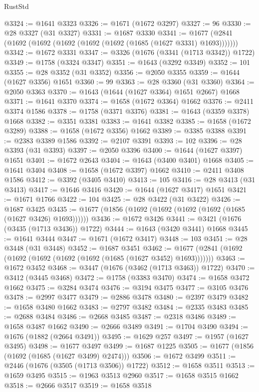 \begin{lexlean}{RustStd}
\begin{coremodule}
@3324 := @1641 @3323
@3326 := @1671 (@1672 @3297)
@3327 := 96
@3330 := @28 @3327 (@31 @3327)
@3331 := @1687 @3330
@3341 := @1677 (@2841 (@1692 (@1692 (@1692 (@1692 (@1692 (@1685 (@1627 @3331) @1693)))))))
@3342 := @1672 @3331
@3347 := @3326 (@1676 (@3341 (@1713 @3342)) @1722)
@3349 := @1758 (@3324 @3347)
@3351 := @1643 (@3292 @3349)
@3352 := 101
@3355 := @28 @3352 (@31 @3352)
@3356 := @2050 @3355
@3359 := @1644 (@1627 @3356) @1651
@3360 := 99
@3363 := @28 @3360 (@31 @3360)
@3364 := @2050 @3363
@3370 := @1643 (@1644 (@1627 @3364) @1651 @2667) @1668
@3371 := @1641 @3370
@3374 := @1658 (@1672 @3364) @1662
@3376 := @2411 @3374 @1586
@3378 := @1758 (@3371 @3376)
@3381 := @1643 (@3359 @3378) @1668
@3382 := @3351 @3381
@3383 := @1641 @3382
@3385 := @1658 (@1672 @3289)
@3388 := @1658 (@1672 @3356) @1662
@3389 := @3385 @3388
@3391 := @2383 @3389 @1586
@3392 := @2107 @3391
@3393 := 102
@3396 := @28 @3393 (@31 @3393)
@3397 := @2050 @3396
@3400 := @1644 (@1627 @3397) @1651
@3401 := @1672 @2643
@3404 := @1643 (@3400 @3401) @1668
@3405 := @1641 @3404
@3408 := @1658 (@1672 @3397) @1662
@3410 := @2411 @3408 @1586
@3412 := @3392 (@3405 @3410)
@3413 := 105
@3416 := @28 @3413 (@31 @3413)
@3417 := @1646 @3416
@3420 := @1644 (@1627 @3417) @1651
@3421 := @1671 @1766
@3422 := 104
@3425 := @28 @3422 (@31 @3422)
@3426 := @1687 @3425
@3435 := @1677 (@1856 (@1692 (@1692 (@1692 (@1692 (@1685 (@1627 @3426) @1693))))))
@3436 := @1672 @3426
@3441 := @3421 (@1676 (@3435 (@1713 @3436)) @1722)
@3444 := @1643 (@3420 @3441) @1668
@3445 := @1641 @3444
@3447 := @1671 (@1672 @3417)
@3448 := 103
@3451 := @28 @3448 (@31 @3448)
@3452 := @1687 @3451
@3462 := @1677 (@2841 (@1692 (@1692 (@1692 (@1692 (@1692 (@1685 (@1627 @3452) @1693)))))))
@3463 := @1672 @3452
@3468 := @3447 (@1676 (@3462 (@1713 @3463)) @1722)
@3470 := @3412 (@3445 @3468)
@3472 := @1758 (@3383 @3470)
@3474 := @1658 @3472 @1662
@3475 := @3284 @3474
@3476 := @3194 @3475
@3477 := @3105 @3476
@3478 := @2997 @3477
@3479 := @2886 @3478
@3480 := @2397 @3479
@3482 := @1658 @3480 @1662
@3483 := @2797 @3482
@3484 := @2335 @3483
@3485 := @2688 @3484
@3486 := @2668 @3485
@3487 := @2318 @3486
@3489 := @1658 @3487 @1662
@3490 := @2666 @3489
@3491 := @1704 @3490
@3494 := @1676 (@1882 (@2664 @3491))
@3495 := @1629 @257
@3497 := @1957 (@1627 @3495)
@3498 := @1677 @3497
@3499 := @1687 @1225
@3505 := @1677 (@1856 (@1692 (@1685 (@1627 @3499) @2474)))
@3506 := @1672 @3499
@3511 := @2446 (@1676 (@3505 (@1713 @3506)) @1722)
@3512 := @1658 @3511
@3513 := @1659 @3495
@3515 := @1963 @3513 @2960
@3517 := @1658 @3515 @1662
@3518 := @2666 @3517
@3519 := @1658 @3518

\end{coremodule}
\end{lexlean}
